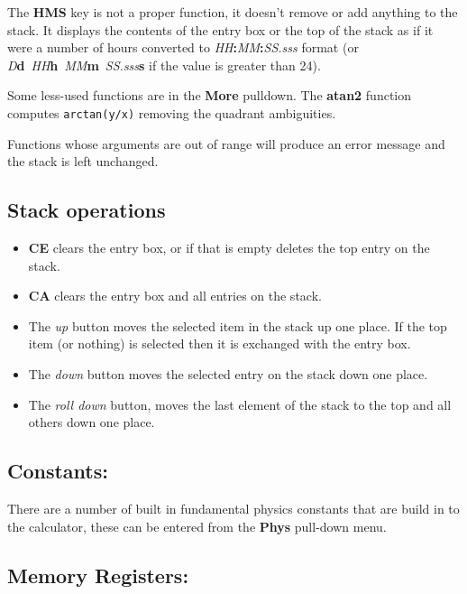 \documentclass{article}
\begin{document}
  The \textbf{HMS} key is not a proper function, it doesn't remove or
  add anything to the stack. It displays the contents of the entry box
  or the top of the stack as if it were a number of hours converted to
  \emph{HH}\textbf{:}\emph{MM}\textbf{:}\emph{SS.sss} format (or
  \emph{D}\textbf{d}~\emph{HH}\textbf{h}~\emph{MM}\textbf{m}~\emph{SS.sss}\textbf{s}
  if the value is greater than 24).

  Some less-used functions are in the \textbf{More} pulldown. The
  \textbf{atan2} function computes \texttt{arctan(y/x)} removing the
  quadrant ambiguities.

  Functions whose arguments are out of range will produce an error
  message and the stack is left unchanged.

  \subsection{Stack operations}

  \begin{itemize}
  \item \textbf{CE} clears the entry box, or if that is empty deletes
    the top entry on the stack.

  \item \textbf{CA} clears the entry box and all entries on the stack.

  \item The \emph{up} button moves the selected item in the stack up
    one place. If the top item (or nothing) is selected then it is
    exchanged with the entry box.

  \item The \emph{down} button moves the selected entry on the stack
    down one place.

  \item The \emph{roll down} button, moves the last element of the
    stack to the top and all others down one place.
  \end{itemize}

  \subsection{Constants:}

  There are a number of built in fundamental physics constants that are
  build in to the calculator, these can be entered from the
  \textbf{Phys} pull-down menu.

  \subsection{Memory Registers:}
\end{document}
